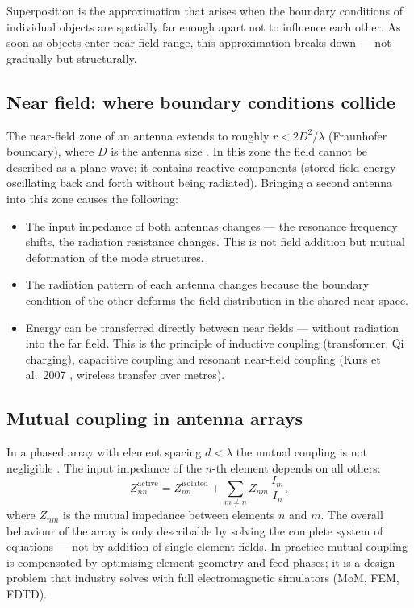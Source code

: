Superposition is the approximation that arises when the boundary conditions
of individual objects are spatially far enough apart not to influence each
other. As soon as objects enter near-field range, this approximation breaks
down --- not gradually but structurally.

\subsection*{Near field: where boundary conditions collide}

The near-field zone of an antenna extends to roughly $r < 2D^2/\lambda$
(Fraunhofer boundary), where $D$ is the antenna size \EM. In this zone
the field cannot be described as a plane wave; it contains reactive
components (stored field energy oscillating back and forth without being
radiated). Bringing a second antenna into this zone causes the following:

\begin{itemize}[nosep]
\item The input impedance of both antennas changes --- the resonance
  frequency shifts, the radiation resistance changes. This is not field
  addition but mutual deformation of the mode structures.
\item The radiation pattern of each antenna changes because the boundary
  condition of the other deforms the field distribution in the shared
  near space.
\item Energy can be transferred directly between near fields --- without
  radiation into the far field. This is the principle of inductive coupling
  (transformer, Qi charging), capacitive coupling and resonant near-field
  coupling (Kurs et al.\ 2007 \cite{Kurs2007}, wireless transfer over metres).
\end{itemize}

\subsection*{Mutual coupling in antenna arrays}

In a phased array with element spacing $d < \lambda$ the mutual coupling
is not negligible \cite{Mailloux2017,Pozar2012}. The input impedance of the
$n$-th element depends on all others:
\[
  Z_{nn}^{\mathrm{active}} = Z_{nn}^{\mathrm{isolated}}
  + \sum_{m \neq n} Z_{nm}\,\frac{I_m}{I_n},
\]
where $Z_{nm}$ is the mutual impedance between elements $n$ and $m$. The
overall behaviour of the array is only describable by solving the complete
system of equations --- not by addition of single-element fields. In
practice mutual coupling is compensated by optimising element geometry and
feed phases; it is a design problem that industry solves with full
electromagnetic simulators (MoM, FEM, FDTD).

